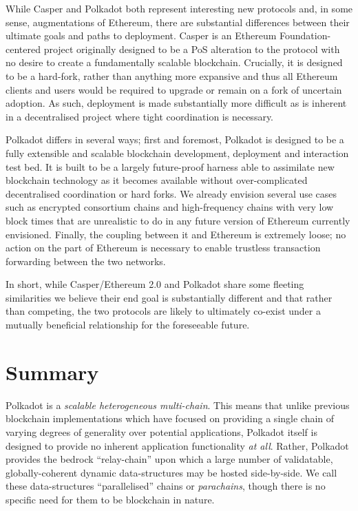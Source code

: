 \documentclass[9pt,oneside]{amsart}
\begin{document}
\begin{multicols}{2}
 While Casper and Polkadot both represent interesting new protocols and, in some sense, augmentations of Ethereum, there are substantial differences between their ultimate goals and paths to deployment. Casper is an Ethereum Foundation-centered project originally designed to be a PoS alteration to the protocol with no desire to create a fundamentally scalable blockchain. Crucially, it is designed to be a hard-fork, rather than anything more expansive and thus all Ethereum clients and users would be required to upgrade or remain on a fork of uncertain adoption. As such, deployment is made substantially more difficult as is inherent in a decentralised project where tight coordination is necessary.

 Polkadot differs in several ways; first and foremost, Polkadot is designed to be a fully extensible and scalable blockchain development, deployment and interaction test bed. It is built to be a largely future-proof harness able to assimilate new blockchain technology as it becomes available without over-complicated decentralised coordination or hard forks. We already envision several use cases such as encrypted consortium chains and high-frequency chains with very low block times that are unrealistic to do in any future version of Ethereum currently envisioned. Finally, the coupling between it and Ethereum is extremely loose; no action on the part of Ethereum is necessary to enable trustless transaction forwarding between the two networks.

 In short, while Casper/Ethereum 2.0 and Polkadot share some fleeting similarities we believe their end goal is substantially different and that rather than competing, the two protocols are likely to ultimately co-exist under a mutually beneficial relationship for the foreseeable future.

\section{Summary}\label{summary}

Polkadot is a \emph{scalable heterogeneous multi-chain}. This means that unlike previous blockchain implementations which have focused on providing a single chain of varying degrees of generality over potential applications, Polkadot itself is designed to provide no inherent application functionality \emph{at all}. Rather, Polkadot provides the bedrock ``relay-chain'' upon which a large number of validatable, globally-coherent dynamic data-structures may be hosted side-by-side. We call these data-structures ``parallelised'' chains or \textit{parachains}, though there is no specific need for them to be blockchain in nature.


\end{multicols}
\end{document}
